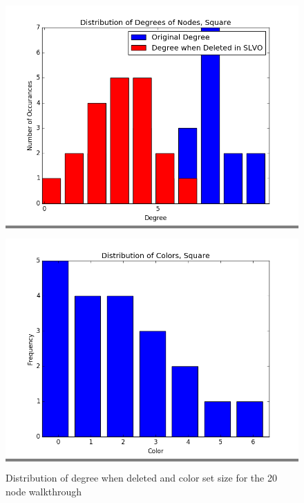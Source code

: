 \documentclass{article}
\begin{document}
        \begin{figure}
            \begin{minipage}{0.45\textwidth}
            \colorbox{gray}{\includegraphics[width=\linewidth]{./graphs/hist_deg_del_wt.png}}
            \end{minipage}
            \hspace{\fill}
            \begin{minipage}{0.45\textwidth}
            \colorbox{gray}{\includegraphics[width=\linewidth]{./graphs/hist_colors_wt.png}}
            \end{minipage}

            \caption{Distribution of degree when deleted and color set size for the 20 node walkthrough}
            \label{histwt}
        \end{figure}
\end{document}
